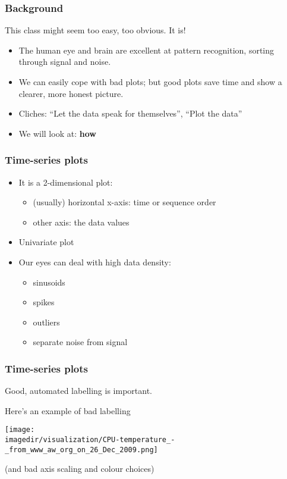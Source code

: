 \begin{frame}\frametitle{Background}
	
	This class might seem too easy, too obvious. It is!
	\begin{itemize}
		\item	The human eye and brain are excellent at pattern recognition, sorting through signal and noise. \pause 
		\item	We can easily cope with bad plots; but good plots save time and show a clearer, more honest picture. 
		\item	Cliches: ``Let the data speak for themselves'', ``Plot the data'' 
		\item	We will look at: \textbf{how} 
	\end{itemize}
\end{frame}

\begin{frame}\frametitle{Time-series plots}
	\begin{itemize}
		\item	It is a 2-dimensional plot: 
		\begin{itemize}
			\item	(usually) horizontal x-axis: time or sequence order 
			\item	other axis: the data values 
		\end{itemize}
		\item	Univariate plot 
	\end{itemize}
	\begin{itemize}
		\item	Our eyes can deal with high data density: 
		\begin{itemize}
			\item	sinusoids 
			\item	spikes 
			\item	outliers 
			\item	separate noise from signal 
		\end{itemize}
	\end{itemize}
\end{frame}

\begin{frame}\frametitle{Time-series plots}
	
	Good, automated labelling is important.
	
	Here's an example of bad labelling
	\begin{center}
		\texttt{[image: \\imagedir/visualization/CPU-temperature\_-\_from\_www\_aw\_org\_on\_26\_Dec\_2009.png]}
	\end{center}
	(and bad axis scaling and colour choices)
\end{frame}

